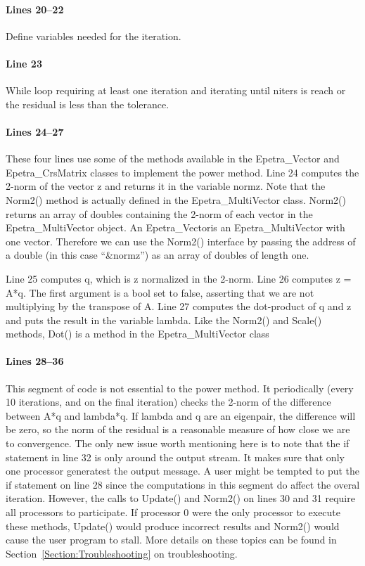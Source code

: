 \documentclass[12pt,relax]{EpetraUserGuide}
\renewcommand{\vector}{Epetra\_Vector}
\newcommand{\multivector}{Epetra\_MultiVector}
\newcommand{\crsmatrix}{Epetra\_CrsMatrix}
\begin{document}
\paragraph{Lines 20--22}
Define variables needed for the iteration.
\paragraph{Line 23} While loop requiring at least one iteration and
iterating until niters is reach or the residual is less than the
tolerance.
\paragraph{Lines 24--27}
These four lines use some of the methods available in the \vector{}
and \crsmatrix{} classes to implement the power method.  Line 24
computes the 2-norm of the vector z and returns it in the variable
normz.  Note that the Norm2() method is actually defined in the
\multivector{} class.  Norm2() returns an array of doubles containing
the 2-norm of each vector in the \multivector{} object.  An \vector is
an \multivector{} with one vector.  Therefore we can use the Norm2()
interface by passing the address of a double (in this case
``\&normz'') as an array of doubles of length one.

Line 25 computes q, which is z normalized in the 2-norm.  Line 26
computes z = A*q.  The first argument is a bool set to false, asserting
that we are not multiplying by the transpose of A.  Line 27 computes
the dot-product of q and z and puts the result in the variable
lambda.  Like the Norm2() and Scale() methods, Dot() is a method in
the \multivector{} class
\paragraph{Lines 28--36}
This segment of code is not essential to the power method.  It
periodically (every 10 iterations, and on the final iteration) checks
the 2-norm of the difference between A*q and lambda*q.  If lambda and
q are an eigenpair, the difference will be zero, so the norm of the
residual is a reasonable measure of how close we are to convergence.
The only new issue worth mentioning here is to note that the if statement in
line 32 is only around the output stream.  It makes sure that only one
processor generatest the output message.  A user might be tempted to
put the if statement on line 28 since the computations in this segment
do affect the overal iteration.  However, the calls to Update() and
Norm2() on lines 30 and 31 require all processors to participate.  If
processor 0 were the only processor to execute these methods, Update()
would produce incorrect results and Norm2() would cause the user
program to stall.  More details on these topics can be found in
Section~\ref{Section:Troubleshooting} on troubleshooting.
\end{document}
